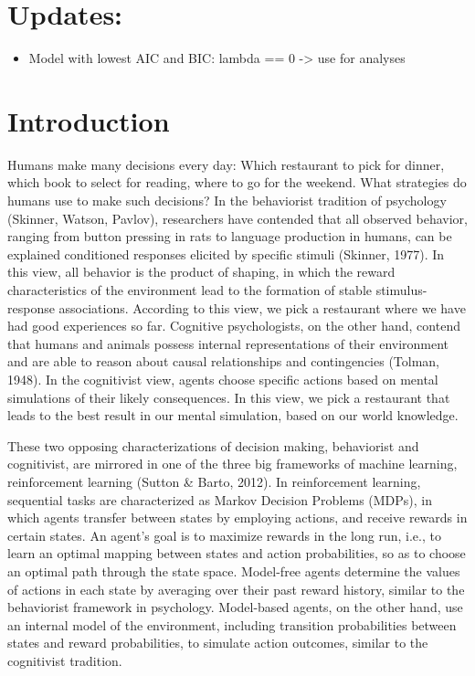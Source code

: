 \documentclass[11pt]{article} %
\begin{document}
\section{Updates:}
\begin{itemize}
	\item Model with lowest AIC and BIC: lambda == 0 -> use for analyses
\end{itemize}

\startmain %

\section{Introduction}

Humans make many decisions every day: Which restaurant to pick for dinner, which book to select for reading, where to go for the weekend. What strategies do humans use to make such decisions? In the behaviorist tradition of psychology (Skinner, Watson, Pavlov), researchers have contended that all observed behavior, ranging from button pressing in rats to language production in humans, can be explained conditioned responses elicited by specific stimuli (Skinner, 1977). In this view, all behavior is the product of shaping, in which the reward characteristics of the environment lead to the formation of stable stimulus-response associations. According to this view, we pick a restaurant where we have had good experiences so far. Cognitive psychologists, on the other hand, contend that humans and animals possess internal representations of their environment and are able to reason about causal relationships and contingencies (Tolman, 1948). In the cognitivist view, agents choose specific actions based on mental simulations of their likely consequences. In this view, we pick a restaurant that leads to the best result in our mental simulation, based on our world knowledge.

These two opposing characterizations of decision making, behaviorist and cognitivist, are mirrored in one of the three big frameworks of machine learning, reinforcement learning (Sutton \& Barto, 2012). In reinforcement learning, sequential tasks are characterized as Markov Decision Problems (MDPs), in which agents transfer between states by employing actions, and receive rewards in certain states. An agent's goal is to maximize rewards in the long run, i.e., to learn an optimal mapping between states and action probabilities, so as to choose an optimal path through the state space. Model-free agents determine the values of actions in each state by averaging over their past reward history, similar to the behaviorist framework in psychology. Model-based agents, on the other hand, use an internal model of the environment, including transition probabilities between states and reward probabilities, to simulate action outcomes, similar to the cognitivist tradition.
\end{document}
